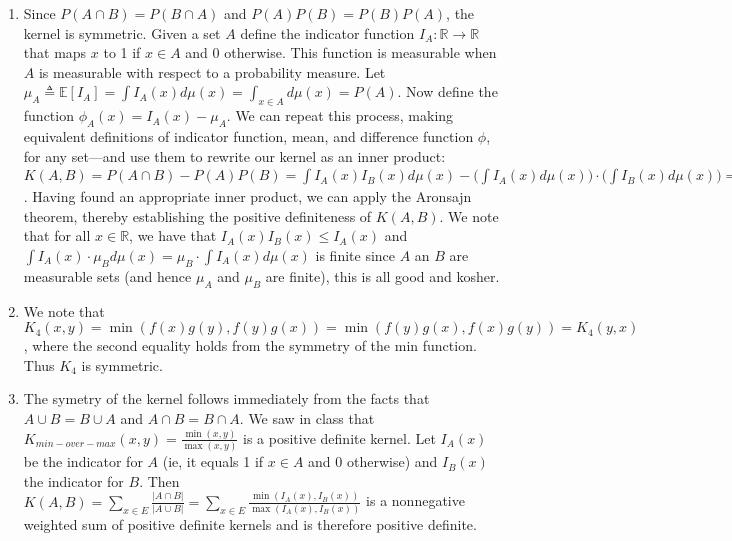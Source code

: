 \documentclass[12pt]{article}
\newenvironment{exercise}[2][Exercise]{\begin{trivlist}
\item[\hskip \labelsep {\bfseries #1}\hskip \labelsep {\bfseries #2.}]}{\end{trivlist}}
\begin{document}
\begin{exercise}{1}
\begin{enumerate}
		\item Since $P(A \cap B) = P(B \cap A)$ and $P(A)P(B) = P(B)P(A)$, the kernel is symmetric. Given a set $A$ define the indicator function $I_A: \mathbb{R} \rightarrow \mathbb{R}$ that maps $x$ to 1 if $x\in A$ and 0 otherwise. This function is measurable when $A$ is measurable with respect to a probability measure. Let $\mu_A \triangleq \mathbb{E}[I_A] = \int I_A (x) d \mu (x) = \int_{x \in A} d \mu (x) = P(A).$ Now define the function $\phi_A(x) = I_A(x) - \mu_A.$ We can repeat this process, making equivalent definitions of indicator function, mean, and difference function $\phi$, for any set---and use them to rewrite our kernel as an inner product: $K(A,B) = P(A\cap B) - P(A)P(B) = \int I_A (x) I_B(x) d \mu(x) - \big(\int I_A(x) d \mu(x) \big) \cdot \big(\int I_B(x) d\mu(x)\big) = \mathbb{E}[I_A I_B] - \mathbb{E}[I_A]\mathbb{E}[I_B] =\mathbb{E}[I_AI_B] - \mu_A\mu_B = \mathbb{E}[I_AI_B] - \mu_A\mathbb{E}[I_B] - \mu_B \mathbb{E}[I_A] -\mu_A\mu_B = \mathbb{E}[(I_A -\mu_A)(I_B - \mu_B)] = \int \phi_A (x) \phi_B (x) d \mu (x) = \langle \phi_A, \phi_B \rangle$. Having found an appropriate inner product, we can apply the Aronsajn theorem, thereby establishing the positive definiteness of $K(A,B)$. We note that for all $x\in \mathbb{R}$, we have that $I_A(x)I_B(x) \leq I_A(x)$ and $\int I_A(x) \cdot \mu_B d\mu(x) = \mu_B \cdot \int I_A(x) d\mu(x)$ is finite since $A$ an $B$ are measurable sets (and hence $\mu_A$ and $\mu_B$ are finite), this is all good and kosher.
		\item We note that $K_4(x,y) = \min (f(x)g(y), f(y)g(x)) = \min (f(y)g(x), f(x)g(y)) = K_4(y,x)$, where the second equality holds from the symmetry of the min function. Thus $K_4$ is symmetric.
		\item The symetry of the kernel follows immediately from the facts that $A \cup B = B \cup A$ and $A \cap B = B \cap A$. We saw in class that $K_{min-over-max}(x,y) = \frac{\min(x,y)}{\max(x,y)}$ is a positive definite kernel. Let $I_A(x)$ be the indicator for $A$ (ie, it equals 1 if $x \in A$ and 0 otherwise) and $I_B(x)$ the indicator for $B$. Then $K(A,B) = \sum_{x \in E} \frac{|A \cap B|}{|A \cup B|} = \sum_{x \in E} \frac{\min(I_A(x), I_B(x))}{\max(I_A(x), I_B(x))}$ is a nonnegative weighted sum of positive definite kernels and is therefore positive definite.
			
	\end{enumerate}

\end{exercise}
\end{document}
